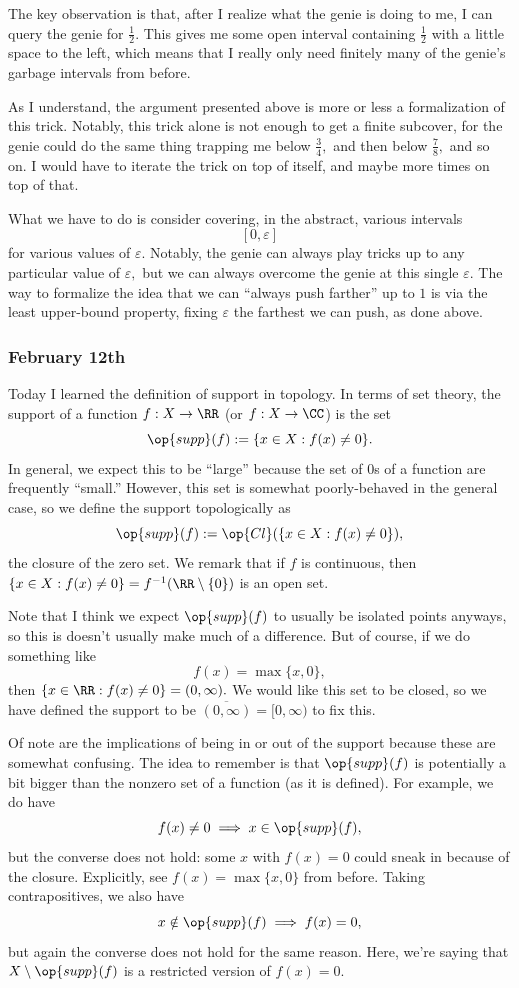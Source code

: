 The key observation is that, after I realize what the genie is doing to me, I can query the genie for $\frac12.$ This gives me some open interval containing $\frac12$ with a little space to the left, which means that I really only need finitely many of the genie's garbage intervals from before.

As I understand, the argument presented above is more or less a formalization of this trick. Notably, this trick alone is not enough to get a finite subcover, for the genie could do the same thing trapping me below $\frac34,$ and then below $\frac78,$ and so on. I would have to iterate the trick on top of itself, and maybe more times on top of that.

What we have to do is consider covering, in the abstract, various intervals
\[[0,\varepsilon]\]
for various values of $\varepsilon.$ Notably, the genie can always play tricks up to any particular value of $\varepsilon,$ but we can always overcome the genie at this single $\varepsilon.$ The way to formalize the idea that we can ``always push farther'' up to $1$ is via the least upper-bound property, fixing $\varepsilon$ the farthest we can push, as done above.

\subsubsection{February 12th}
Today I learned the definition of support in topology. In terms of set theory, the support of a function $f:X\to\RR$ (or $f:X\to\CC$) is the set
\[\op{supp}(f):=\{x\in X:f(x)\ne0\}.\]
In general, we expect this to be ``large'' because the set of $0$s of a function are frequently ``small.'' However, this set is somewhat poorly-behaved in the general case, so we define the support topologically as
\[\op{supp}(f):=\op{Cl}(\{x\in X:f(x)\ne0\}),\]
the closure of the zero set. We remark that if $f$ is continuous, then $\{x\in X:f(x)\ne0\}=f^{-1}(\RR\setminus\{0\})$ is an open set.

Note that I think we expect $\op{supp}(f)$ to usually be isolated points anyways, so this is doesn't usually make much of a difference. But of course, if we do something like
\[f(x)=\max\{x,0\},\]
then $\{x\in\RR:f(x)\ne0\}=(0,\infty).$ We would like this set to be closed, so we have defined the support to be $\overline{(0,\infty)}=[0,\infty)$ to fix this.

Of note are the implications of being in or out of the support because these are somewhat confusing. The idea to remember is that $\op{supp}(f)$ is potentially a bit bigger than the nonzero set of a function (as it is defined). For example, we do have
\[f(x)\ne0\implies x\in\op{supp}(f),\]
but the converse does not hold: some $x$ with $f(x)=0$ could sneak in because of the closure. Explicitly, see $f(x)=\max\{x,0\}$ from before. Taking contrapositives, we also have
\[x\notin\op{supp}(f)\implies f(x)=0,\]
but again the converse does not hold for the same reason. Here, we're saying that $X\setminus\op{supp}(f)$ is a restricted version of $f(x)=0.$

